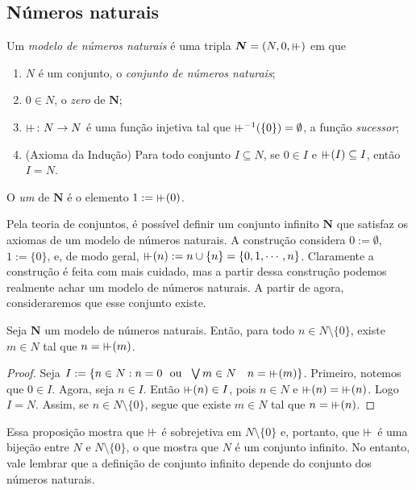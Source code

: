 \subsection{Números naturais}

\begin{definition}
	Um \emph{modelo de números naturais} é uma tripla $\bm N = (N,0,\suce)$ em que 
	\begin{enumerate}
	\item $N$ é um conjunto, o \emph{conjunto de números naturais};
	\item $0 \in N$, o \emph{zero} de $\bm N$;
	\item $\suce\colon N \to N$ é uma função injetiva tal que $\suce\inv(\{0\})=\emptyset$, a função \emph{sucessor};
	\item (Axioma da Indução) Para todo conjunto $I \subseteq N$, se $0 \in I$ e $\suce(I) \subseteq I$, então $I=N$.
	\end{enumerate}
O \emph{um} de $\bm N$ é o elemento $1 := \suce(0)$.
\end{definition}

Pela teoria de conjuntos, é possível definir um conjunto infinito $\bm N$ que satisfaz os axiomas de um modelo de números naturais. A construção considera $0 := \emptyset$, $1 := \{0\}$, e, de modo geral, $\suce(n) := n \cup \{n\} = \{0,1,\cdots,n\}$. Claramente a construção é feita com mais cuidado, mas a partir dessa construção podemos realmente achar um modelo de números naturais. A partir de agora, consideraremos que esse conjunto existe.

\begin{proposition}
	Seja $\bm N$ um  modelo de números naturais. Então, para todo $n \in N\setminus \{0\}$, existe $m \in N$ tal que $n=\suce(m)$.
\end{proposition}
\begin{proof}
	Seja $I := \{n \in N:n=0 \text{\ \ ou\ \ } \exists m \in N \quad n=\suce(m)\}$. Primeiro, notemos que $0 \in I$. Agora, seja $n \in I$. Então $\suce(n) \in I$, pois $n \in N$ e $\suce(n)=\suce(n)$. Logo $I=N$. Assim, se $n \in N \setminus \{0\}$, segue que existe $m \in N$ tal que $n=\suce(n)$.
\end{proof}

Essa proposição mostra que $\suce$ é sobrejetiva em $N \setminus \{0\}$ e, portanto, que $\suce$ é uma bijeção entre $N$ e $N \setminus \{0\}$, o que mostra que $N$ é um conjunto infinito. No entanto, vale lembrar que a definição de conjunto infinito depende do conjunto dos números naturais.

